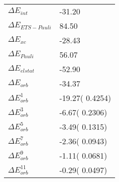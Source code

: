 \begin{table}[]
\caption{}
\label{}
\begin{tabular}{ll}
\hline
$\Delta E_{int}$          &       -31.20   \\
$\Delta E_{ETS-Pauli}$    &        84.50   \\
$\Delta E_{xc}$           &       -28.43   \\
$\Delta E_{Pauli}$        &        56.07   \\
$\Delta E_{elstat}$       &       -52.90   \\
$\Delta E_{orb}$          &       -34.37   \\
$\Delta E^{1}_{orb}$      &       -19.27(      0.4254)   \\
$\Delta E^{3}_{orb}$      &        -6.67(      0.2306)   \\
$\Delta E^{5}_{orb}$      &        -3.49(      0.1315)   \\
$\Delta E^{7}_{orb}$      &        -2.36(      0.0943)   \\
$\Delta E^{9}_{orb}$      &        -1.11(      0.0681)   \\
$\Delta E^{11}_{orb}$     &        -0.29(      0.0497)   \\
\end{tabular}
\end{table}

